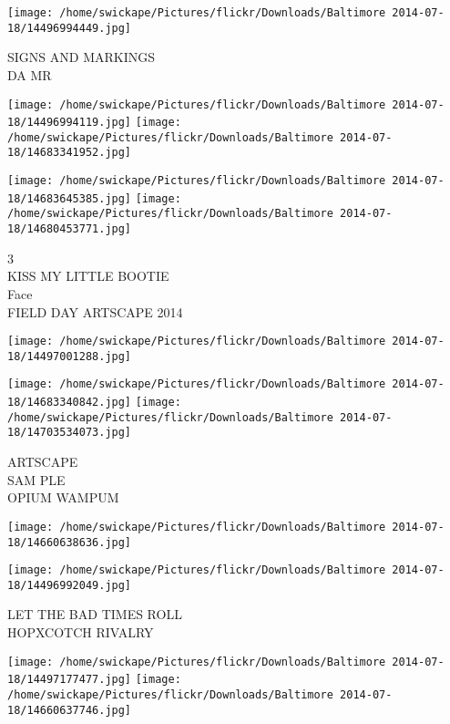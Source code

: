 \documentclass[10pt,letterpaper]{article}
\begin{document}
\vspace{0.25in}
\texttt{[image: /home/swickape/Pictures/flickr/Downloads/Baltimore 2014-07-18/14496994449.jpg]}

SIGNS AND MARKINGS\\
DA MR\\
\pagebreak

\texttt{[image: /home/swickape/Pictures/flickr/Downloads/Baltimore 2014-07-18/14496994119.jpg]}
\texttt{[image: /home/swickape/Pictures/flickr/Downloads/Baltimore 2014-07-18/14683341952.jpg]}

\texttt{[image: /home/swickape/Pictures/flickr/Downloads/Baltimore 2014-07-18/14683645385.jpg]}
\texttt{[image: /home/swickape/Pictures/flickr/Downloads/Baltimore 2014-07-18/14680453771.jpg]}

3\\
KISS MY LITTLE BOOTIE\\
Face\\
FIELD DAY ARTSCAPE 2014\\
\pagebreak

\texttt{[image: /home/swickape/Pictures/flickr/Downloads/Baltimore 2014-07-18/14497001288.jpg]}

\vspace{0.25in}
\texttt{[image: /home/swickape/Pictures/flickr/Downloads/Baltimore 2014-07-18/14683340842.jpg]}
\texttt{[image: /home/swickape/Pictures/flickr/Downloads/Baltimore 2014-07-18/14703534073.jpg]}

ARTSCAPE\\
SAM PLE\\
OPIUM WAMPUM\\
\pagebreak

\texttt{[image: /home/swickape/Pictures/flickr/Downloads/Baltimore 2014-07-18/14660638636.jpg]}

\vspace{0.25in}
\texttt{[image: /home/swickape/Pictures/flickr/Downloads/Baltimore 2014-07-18/14496992049.jpg]}

LET THE BAD TIMES ROLL\\
HOPXCOTCH RIVALRY\\
\pagebreak

\texttt{[image: /home/swickape/Pictures/flickr/Downloads/Baltimore 2014-07-18/14497177477.jpg]}
\texttt{[image: /home/swickape/Pictures/flickr/Downloads/Baltimore 2014-07-18/14660637746.jpg]}
\end{document}
